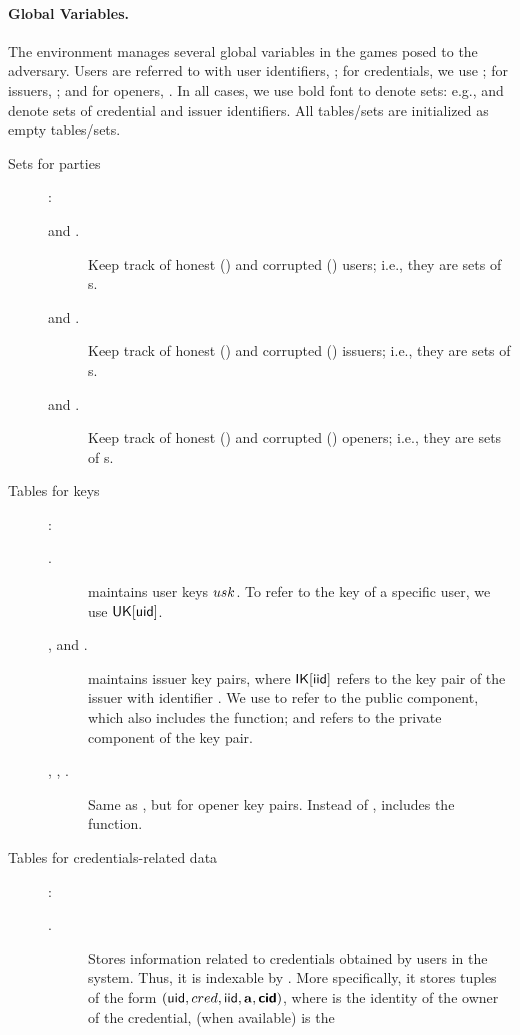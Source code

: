\paragraph{Global Variables.} %
The environment manages several global variables in the games posed to the
adversary. Users are referred to with user identifiers, \uid; for credentials,
we use \cid; for issuers, \iid; and for openers, \oid. In all cases, we use bold
font to denote sets: e.g., \scid and \siid denote sets of credential and issuer
identifiers. All tables/sets are initialized as empty tables/sets.

\begin{description}
\item[Sets for parties]:
  \begin{description}
  \item[\HU and \CU.] Keep track of honest (\HU) and corrupted (\CU) users;
    i.e., they are sets of {\uid}s.
  \item[\HI and \CI.] Keep track of honest (\HI) and corrupted (\CI) issuers;
    i.e., they are sets of {\iid}s.
  \item[\HO and \CO.] Keep track of honest (\HO) and corrupted (\CO) openers;
    i.e., they are sets of {\oid}s.
  \end{description}
\item[Tables for keys]:
  \begin{description}
  \item[\UK.] \UK maintains user keys $usk$. To refer to the key of a specific
    user, we use $\mathsf{UK}[\mathsf{uid}]$. 
  \item[\IK, \PUBIK and \PRVIK.] \IK maintains issuer key pairs, where
    $\mathsf{IK}[\mathsf{iid}]$ refers to the key pair of the issuer with identifier \iid. We
    use \PUBIK to refer to the public component, which also includes the \fissue
    function; and \PRVIK refers to the private component of the key pair.
  \item[\OK, \PUBOK, \PRVOK.] Same as \IK, but for opener key pairs. Instead
    of \fissue, \OK includes the \finsp function.
  \end{description}
\item[Tables for credentials-related data]:
  \begin{description}
  \item[\CRED.] Stores information related to credentials obtained by users in
    the system. Thus, it is indexable by \cid. More specifically, it stores
    tuples of the form $(\mathsf{uid},cred,\mathsf{iid},\mathbf{a},\boldsymbol{\mathsf{cid}})$, where \uid is the
    identity of the owner of the credential, \cred (when available) is the

\end{description}
\end{description}
